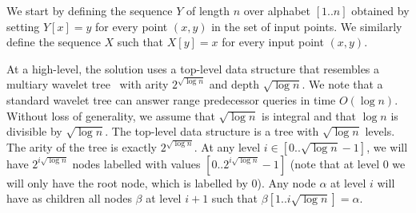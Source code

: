 \documentclass[11pt,runningheads]{llncs}
\begin{document}
We start by defining the sequence $Y$ of length $n$ over alphabet $[1..n]$ 
obtained by setting $Y[x]=y$ for every point $(x,y)$ in the set of input points. 
We similarly define the sequence $X$ such that $X[y]=x$ for every input 
point $(x,y)$.

At a high-level, the solution uses a top-level data structure that resembles 
a multiary wavelet tree~\cite{FMMN07} with arity $2^{\sqrt{\log n}}$
and depth $\sqrt{\log n}$. We note that a standard wavelet tree can answer 
range predecessor queries in time $O(\log n)$. 
Without loss of generality, we assume that $\sqrt{\log n}$ is 
integral and that $\log n$ is divisible by $\sqrt{\log n}$. 
The top-level data structure is a tree 
with $\sqrt{\log n}$ levels. The arity of the tree is exactly 
$2^{\sqrt{\log n}}$. 
At any level $i\in[0..\sqrt{\log n}-1]$, we will have $2^{i\sqrt{\log n}}$
nodes labelled with values $[0..2^{i\sqrt{\log n}}-1]$
(note that at level $0$ we will only have the root 
node, which is labelled by $0$). 
Any node $\alpha$ at level $i$ will have as children all nodes 
$\beta$ at level $i+1$ such that $\beta[1..i\sqrt{\log n}]=\alpha$. 
\end{document}
